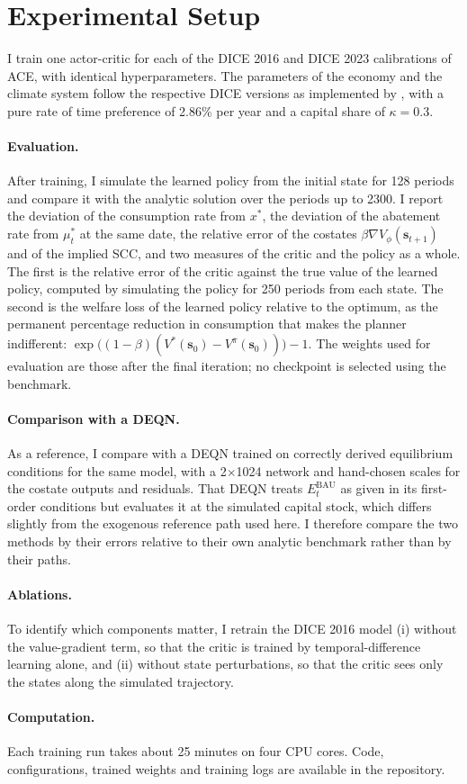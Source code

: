 \section{Experimental Setup}
\label{sec:setup}

I train one actor-critic for each of the DICE 2016 and DICE 2023 calibrations of ACE, with identical hyperparameters. The parameters of the economy and the climate system follow the respective DICE versions as implemented by \textcite{traeger2021analytic_discussion}, with a pure rate of time preference of 2.86\% per year and a capital share of \(\kappa = 0.3\).

\paragraph{Evaluation.} After training, I simulate the learned policy from the initial state for 128 periods and compare it with the analytic solution over the periods up to 2300. I report the deviation of the consumption rate from \(x^*\), the deviation of the abatement rate from \(\mu^*_t\) at the same date, the relative error of the costates \(\beta\nabla V_\phi(\bm{s}_{t+1})\) and of the implied SCC, and two measures of the critic and the policy as a whole. The first is the relative error of the critic against the true value of the learned policy, computed by simulating the policy for 250 periods from each state. The second is the welfare loss of the learned policy relative to the optimum, as the permanent percentage reduction in consumption that makes the planner indifferent: \(\exp\big((1-\beta)(V^*(\bm{s}_0) - V^{\pi}(\bm{s}_0))\big) - 1\). The weights used for evaluation are those after the final iteration; no checkpoint is selected using the benchmark.

\paragraph{Comparison with a DEQN.} As a reference, I compare with a DEQN trained on correctly derived equilibrium conditions for the same model, with a 2\(\times\)1024 network and hand-chosen scales for the costate outputs and residuals. That DEQN treats \(E^{\text{BAU}}_t\) as given in its first-order conditions but evaluates it at the simulated capital stock, which differs slightly from the exogenous reference path used here. I therefore compare the two methods by their errors relative to their own analytic benchmark rather than by their paths.

\paragraph{Ablations.} To identify which components matter, I retrain the DICE 2016 model (i) without the value-gradient term, so that the critic is trained by temporal-difference learning alone, and (ii) without state perturbations, so that the critic sees only the states along the simulated trajectory.

\paragraph{Computation.} Each training run takes about 25 minutes on four CPU cores. Code, configurations, trained weights and training logs are available in the repository.
